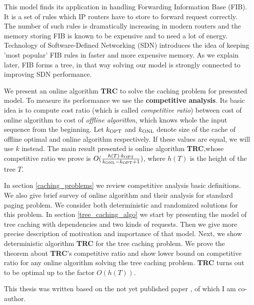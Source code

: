 This model finds its application in handling Forwarding Information Base (FIB). 
It is a set of rules which IP routers have to store to forward request 
correctly. The number of such rules is dramatically increasing in modern 
routers and the memory storing FIB is known to be expensive and to need a lot 
of energy. Technology of Software-Defined Networking (SDN) introduces the idea 
of keeping 'most popular' FIB rules in faster and more expensive memory. 
As we explain later, FIB forms a tree, in that way solving our model is strongly
connected to improving SDN performance.

We present an online algorithm \textbf{TRC} to solve the caching problem 
for presented model. To measure its performance we use the \textbf{competitive 
analysis}. Its basic idea is to compute cost ratio (which is called 
\textit{competitive ratio}) between cost of online algorithm to cost of 
\textit{offline algorithm}, which knows whole the input sequence from the 
beginning. Let $k_{\mathrm{OPT}}$ and $k_{\mathrm{ONL}}$ denote size of the cache of
offline optimal and online algorithm respectively. If these values are equal, we
will use $k$ instead. The main result presented is online algorithm 
\textbf{TRC},whose competitive ratio we prove is 
$O(\frac{h(T) \cdot k_{\mathrm{OPT}}}{k_{\mathrm{ONL}} - k_{\mathrm{OPT}} + 1})$, where $h(T)$ is
the height of the tree $T$.

In section \ref{caching_problems} we review competitive analysis basic 
definitions. We also give brief survey of online algorithm and their analysis 
for standard paging problem. We consider both deterministic and randomized 
solutions for this problem. In section \ref{tree_caching_algo} we start by 
presenting the model of tree caching with dependencies and two kinds of 
requests. Then we give more precise description of motivation and importance of
that model. Next, we show deterministic algorithm \textbf{TRC} for the tree 
caching problem. We prove the theorem about \textbf{TRC}'s  
competitive ratio and show lower bound on competitive ratio for any online 
algorithm solving the tree caching problem. \textbf{TRC} turns out to be 
optimal up to the factor $O(h(T))$.

This thesis was written based on the not yet published paper \cite{mypap}, 
of which I am co-author.
